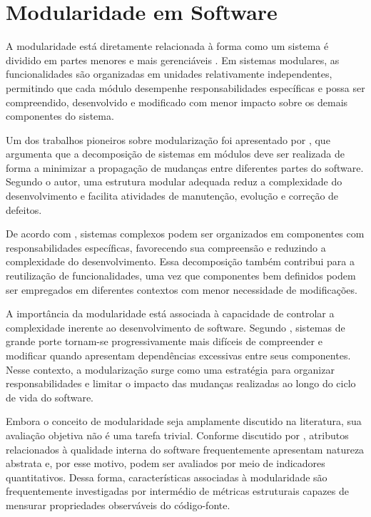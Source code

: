 \section{Modularidade em Software}
\label{sec:modularidade-em-software}

A modularidade está diretamente relacionada à forma como um sistema é dividido em partes menores e mais gerenciáveis \cite{parnas1972}. 
Em sistemas modulares, as funcionalidades são organizadas em unidades relativamente independentes, permitindo que cada módulo 
desempenhe responsabilidades específicas e possa ser compreendido, desenvolvido e modificado com menor impacto sobre os demais 
componentes do sistema.

Um dos trabalhos pioneiros sobre modularização foi apresentado por , que argumenta que a decomposição de sistemas
em módulos deve ser realizada de forma a minimizar a propagação de mudanças entre diferentes partes do software. Segundo o autor, uma 
estrutura modular adequada reduz a complexidade do desenvolvimento e facilita atividades de manutenção, evolução e correção de defeitos.

De acordo com , sistemas complexos podem ser organizados em componentes com responsabilidades específicas, 
favorecendo sua compreensão e reduzindo a complexidade do desenvolvimento. Essa decomposição também contribui para a reutilização de 
funcionalidades, uma vez que componentes bem definidos podem ser empregados em diferentes contextos com menor necessidade de modificações.

A importância da modularidade está associada à capacidade de controlar a complexidade inerente ao desenvolvimento de software. Segundo
, sistemas de grande porte tornam-se progressivamente mais difíceis de compreender e modificar quando
apresentam dependências excessivas entre seus componentes. Nesse contexto, a modularização surge como uma estratégia para organizar 
responsabilidades e limitar o impacto das mudanças realizadas ao longo do ciclo de vida do software.

Embora o conceito de modularidade seja amplamente discutido na literatura, sua avaliação objetiva não é uma tarefa trivial. Conforme discutido por
, atributos relacionados à qualidade interna do software frequentemente apresentam natureza abstrata e, por esse motivo,
podem ser avaliados por meio de indicadores quantitativos. Dessa forma, características associadas à modularidade são frequentemente 
investigadas por intermédio de métricas estruturais capazes de mensurar propriedades observáveis do código-fonte.


